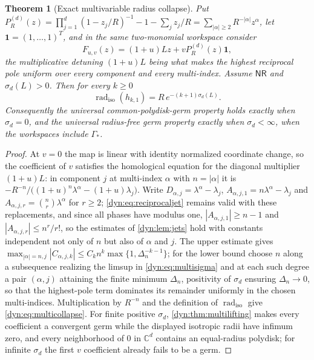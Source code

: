\documentclass[11pt,letterpaper]{article}
\newtheorem{theorem}{Theorem}[section]
\theoremstyle{definition}
\theoremstyle{remark}
\newcommand{\C}{\mathbb C}
\newcommand{\radiso}{\operatorname{rad}_{\mathrm{iso}}}
\newcommand{\nres}{\mathsf{NR}}
\numberwithin{equation}{section}
\begin{document}
\begin{theorem}[Exact multivariable radius collapse]\label{dyn:thm:multicollapse}
Put $P_R^{(d)}(z)=\prod_{j=1}^{d}(1-z_j/R)^{-1}-1-\sum_jz_j/R
=\sum_{|\alpha|\ge2}R^{-|\alpha|}z^{\alpha}$, let
$\mathbf1=(1,\dots,1)^{T}$, and in the same two-monomial workspace consider
\begin{equation}\label{dyn:eq:multiF}
 F_{u,v}(z)=(1+u)Lz+vP_R^{(d)}(z)\mathbf1 ,
\end{equation}
the \emph{multiplicative} detuning $(1+u)L$ being what makes the highest
reciprocal pole uniform over every component and every multi-index. Assume
$\nres$ and $\sigma_d(L)>0$. Then for every $k\ge0$
\begin{equation}\label{dyn:eq:multicollapse}
 \radiso(h_{k,1})=R\,e^{-(k+1)\sigma_d(L)} .
\end{equation}
Consequently the universal common-polydisk-germ property holds exactly when
$\sigma_d=0$, and the universal radius-free germ property exactly when
$\sigma_d<\infty$, when the workspaces include $\Gamma_{*}$.
\end{theorem}
\begin{proof}
At $v=0$ the map is linear with identity normalized coordinate change, so
the coefficient of $v$ satisfies the homological equation for the diagonal
multiplier $(1+u)L$: in component $j$ at multi-index $\alpha$ with
$n=|\alpha|$ it is $-R^{-n}/\bigl((1+u)^{n}\lambda^{\alpha}-(1+u)\lambda_j\bigr)$.
Write $D_{\alpha,j}=\lambda^{\alpha}-\lambda_j$,
$A_{\alpha,j,1}=n\lambda^{\alpha}-\lambda_j$ and
$A_{\alpha,j,r}=\binom nr\lambda^{\alpha}$ for $r\ge2$;
\eqref{dyn:eq:reciprocaljet} remains valid with these replacements, and
since all phases have modulus one, $|A_{\alpha,j,1}|\ge n-1$ and
$|A_{\alpha,j,r}|\le n^{r}/r!$, so the estimates of \cref{dyn:lem:jets}
hold with constants independent not only of $n$ but also of $\alpha$ and
$j$. The upper estimate gives
$\max_{|\alpha|=n,j}|C_{\alpha,j,k}|\le C_kn^{k}\max\{1,\Delta_n^{-k-1}\}$;
for the lower bound choose $n$ along a subsequence realizing the limsup in
\eqref{dyn:eq:multisigma} and at each such degree a pair $(\alpha,j)$
attaining the finite minimum $\Delta_n$, positivity of $\sigma_d$ ensuring
$\Delta_n\to0$, so that the highest-pole term dominates its remainder
uniformly in the chosen multi-indices. Multiplication by $R^{-n}$ and the
definition of $\radiso$ give \eqref{dyn:eq:multicollapse}. For finite
positive $\sigma_d$, \cref{dyn:thm:multilifting} makes every coefficient a
convergent germ while the displayed isotropic radii have infimum zero, and
every neighborhood of $0$ in $\C^{d}$ contains an equal-radius polydisk;
for infinite $\sigma_d$ the first $v$ coefficient already fails to be a
germ.
\end{proof}
\end{document}
